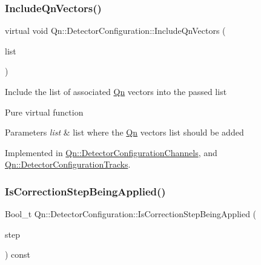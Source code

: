 \subsubsection{\texorpdfstring{Include\+Qn\+Vectors()}{IncludeQnVectors()}}
{\footnotesize\ttfamily virtual void Qn\+::\+Detector\+Configuration\+::\+Include\+Qn\+Vectors (\begin{DoxyParamCaption}\item[{T\+List $\ast$}]{list }\end{DoxyParamCaption})\hspace{0.3cm}{\ttfamily [pure virtual]}}

Include the list of associated \mbox{\hyperlink{namespaceQn}{Qn}} vectors into the passed list

Pure virtual function 
\begin{DoxyParams}{Parameters}
{\em list} & list where the \mbox{\hyperlink{namespaceQn}{Qn}} vectors list should be added \\
\hline
\end{DoxyParams}


Implemented in \mbox{\hyperlink{classQn_1_1DetectorConfigurationChannels_a6756b2b2bed25bee5659953ae82ce5b7}{Qn\+::\+Detector\+Configuration\+Channels}}, and \mbox{\hyperlink{classQn_1_1DetectorConfigurationTracks_ac1c478bdcd744a466d0665eb6062317f}{Qn\+::\+Detector\+Configuration\+Tracks}}.

\mbox{\label{classQn_1_1DetectorConfiguration_a25fce09641fb89b686154a6d6bad823a}} 
\subsubsection{\texorpdfstring{Is\+Correction\+Step\+Being\+Applied()}{IsCorrectionStepBeingApplied()}}
{\footnotesize\ttfamily Bool\+\_\+t Qn\+::\+Detector\+Configuration\+::\+Is\+Correction\+Step\+Being\+Applied (\begin{DoxyParamCaption}\item[{const char $\ast$}]{step }\end{DoxyParamCaption}) const}

